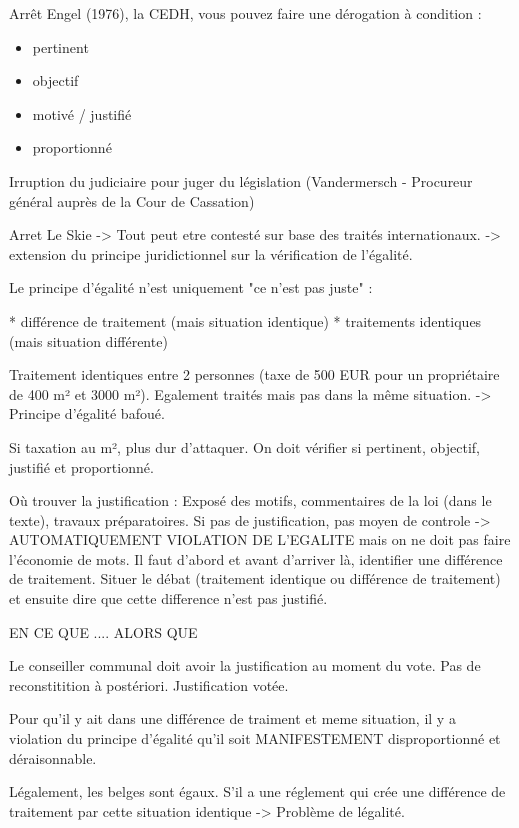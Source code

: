 \documentclass{book}
\begin{document}
Arrêt Engel (1976), la CEDH, vous pouvez faire une dérogation à condition : 

\begin{itemize}
\item pertinent
\item objectif
\item motivé / justifié
\item proportionné
\end{itemize}

Irruption du judiciaire pour juger du législation (Vandermersch - Procureur général auprès de la Cour de Cassation)

Arret Le Skie -> Tout peut etre contesté sur base des traités internationaux. -> extension du principe juridictionnel sur la vérification de l'égalité.

Le principe d'égalité n'est uniquement "ce n'est pas juste" :

* différence de traitement (mais situation identique)
* traitements identiques (mais situation différente)


Traitement identiques entre 2 personnes (taxe de 500 EUR pour un propriétaire de 400 m² et 3000 m²). Egalement traités mais pas dans la même situation. -> Principe d'égalité bafoué.

Si taxation au m², plus dur d'attaquer. On doit vérifier si pertinent, objectif, justifié et proportionné.

Où trouver la justification : Exposé des motifs, commentaires de la loi (dans le texte), travaux préparatoires. Si pas de justification, pas moyen de controle -> AUTOMATIQUEMENT VIOLATION DE L'EGALITE mais on ne doit pas faire l'économie de mots. Il faut d'abord et avant d'arriver là, identifier une différence de traitement. Situer le débat (traitement identique ou différence de traitement) et ensuite dire que cette difference n'est pas justifié.

EN CE QUE .... ALORS QUE

Le conseiller communal doit avoir la justification au moment du vote. Pas de reconstitition à postériori. Justification votée.  

Pour qu'il y ait dans une différence de traiment et meme situation, il y a violation du principe d'égalité qu'il soit MANIFESTEMENT disproportionné et déraisonnable.

Légalement, les belges sont égaux. S'il a une réglement qui crée une différence de traitement par cette situation identique -> Problème de légalité.
\end{document}
